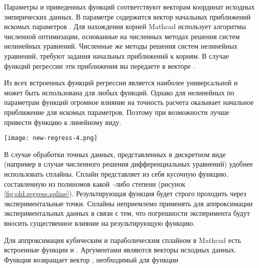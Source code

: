 Параметры  и  приведенных функций соответствуют векторам координат исходных эмпирических данных. В параметре  содержится вектор начальных приближений искомых параметров . Для нахождения корней Mathcad использует алгоритмы численной оптимизации, основанные на численных методах решения систем нелинейных уравнений. Численные же методы решения систем нелинейных уравнений, требуют задания начальных приближений к корням. В случае функций регрессии эти приближения вы передаете в векторе .

Из всех встроенных функций регрессии  является наиболее универсальной и может быть использована для любых функций. Однако для нелинейных по параметрам функций огромное влияние на точность расчета оказывает начальное приближение   для искомых параметров. Поэтому при возможности лучше привести функцию к линейному виду.


\begin{center}
	\texttt{[image: new-regress-4.png]}
\end{center}

В случае обработки точных данных, представленных в дискретном виде (например в случае численного решения дифференциальных уравнений) удобнее использовать сплайны. Сплайн представляет из себя кусочную функцию, составленную из полиномов какой~-либо степени (рисунок \ref{fig:old.regress.spline}). Результирующая функция будет строго проходить через экспериментальные точки. Сплайны неприемлемо применять для аппроксимации экспериментальных данных в связи с тем, что погрешности эксперимента будут вносить существенное влияние на результирующую функцию.

Для аппроксимация кубическим и параболическим сплайном в Mathcad есть встроенные функции  и . Аргументами являются векторы исходных данных. Функция возвращает вектор , необходимый для функции 

